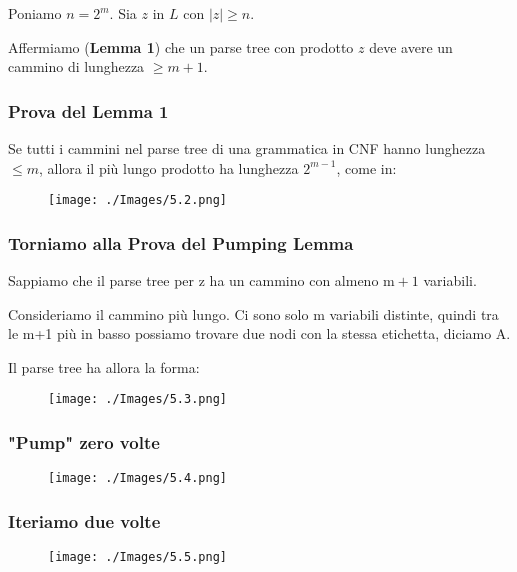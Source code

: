 Poniamo $n=2^{m}$.
Sia $z$ in $L$ con $|z| \geq n$.

Affermiamo (\textbf{Lemma 1}) che un parse tree con prodotto $z$ deve avere un cammino di lunghezza $\geq m+1$.

\subsubsection{Prova del Lemma 1}

Se tutti i cammini nel parse tree di una grammatica in CNF hanno lunghezza $\leq m$, allora il più lungo prodotto ha lunghezza $2^{m-1}$, come in:

\begin{figure}[hbpt!]
    \centering
    \texttt{[image: ./Images/5.2.png]}
\end{figure}
\FloatBarrier

\subsubsection{Torniamo alla Prova del
Pumping Lemma}
Sappiamo che il parse tree per z ha un
cammino con almeno $\mathrm{m}+1$ variabili.

Consideriamo il cammino più lungo.
Ci sono solo m variabili distinte, quindi
tra le m+1 più in basso possiamo trovare
due nodi con la stessa etichetta, diciamo
A. 

Il parse tree ha allora la forma:

\begin{figure}[hbpt!]
    \centering
    \texttt{[image: ./Images/5.3.png]}
\end{figure}
\FloatBarrier

\subsubsection{"Pump" zero volte}

\begin{figure}[hbpt!]
    \centering
    \texttt{[image: ./Images/5.4.png]}
\end{figure}
\FloatBarrier

\subsubsection{Iteriamo due volte}

\begin{figure}[hbpt!]
    \centering
    \texttt{[image: ./Images/5.5.png]}
\end{figure}
\FloatBarrier

